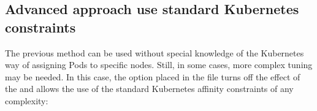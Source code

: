 \documentclass[letterpaper,10pt,english]{sphinxmanual}
\begin{document}
\subsection{Advanced approach \sphinxhyphen{} use standard Kubernetes constraints}
\label{\detokenize{constraints:advanced-approach-use-standard-kubernetes-constraints}}
The previous method can be used without special knowledge of the Kubernetes way
of assigning Pods to specific nodes. Still, in some cases, more complex
tuning may be needed. In this case, the  option placed in the
file turns off the effect of the  and allows
the use of the standard Kubernetes affinity constraints of any complexity:
\end{document}
